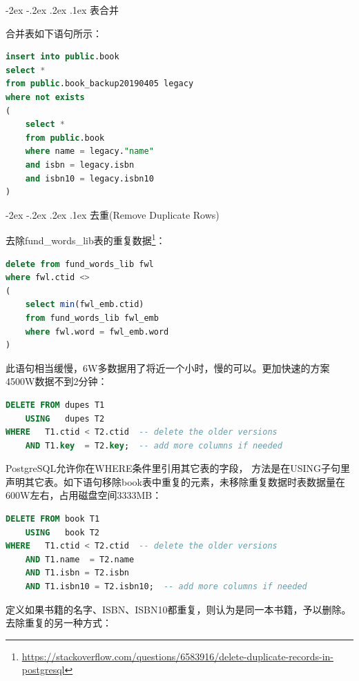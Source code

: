\documentclass[8pt]{book}
\makeatletter
\numberwithin{dummy}{section}
\theoremstyle{ocrenumbox}
\theoremstyle{blacknumex}
\theoremstyle{blacknumbox}
\theoremstyle{ocrenum}
\renewcommand\paragraph{\@startsection{paragraph}{4}{\z@}
	{-2ex \@plus-.2ex \@minus .2ex}
	{.1ex}
	{\normalfont\small\sffamily\bfseries}}
\makeatother
\begin{document}
\paragraph{表合并}


合并表如下语句所示：

\begin{lstlisting}[language=SQL]
insert into public.book
select *
from public.book_backup20190405 legacy
where not exists 
(
    select *
    from public.book
    where name = legacy."name"
    and isbn = legacy.isbn
    and isbn10 = legacy.isbn10
)
\end{lstlisting}


\paragraph{去重(Remove Duplicate Rows)}

去除fund\_words\_lib表的重复数据\footnote{\url{https://stackoverflow.com/questions/6583916/delete-duplicate-records-in-postgresql}}：

\begin{lstlisting}[language=SQL]
delete from fund_words_lib fwl
where fwl.ctid <>
(
	select min(fwl_emb.ctid)
	from fund_words_lib fwl_emb
	where fwl.word = fwl_emb.word
)
\end{lstlisting}

此语句相当缓慢，6W多数据用了将近一个小时，慢的可以。更加快速的方案4500W数据不到2分钟：

\begin{lstlisting}[language=SQL]
DELETE FROM dupes T1
    USING   dupes T2
WHERE   T1.ctid < T2.ctid  -- delete the older versions
    AND T1.key  = T2.key;  -- add more columns if needed
\end{lstlisting}

PostgreSQL允许你在WHERE条件里引用其它表的字段， 方法是在USING子句里声明其它表。如下语句移除book表中重复的元素，未移除重复数据时表数据量在600W左右，占用磁盘空间3333MB：

\begin{lstlisting}[language=SQL]
DELETE FROM book T1
    USING   book T2
WHERE   T1.ctid < T2.ctid  -- delete the older versions
    AND T1.name  = T2.name
	AND T1.isbn = T2.isbn
	AND T1.isbn10 = T2.isbn10;  -- add more columns if needed
\end{lstlisting}

定义如果书籍的名字、ISBN、ISBN10都重复，则认为是同一本书籍，予以删除。去除重复的另一种方式：
\end{document}
